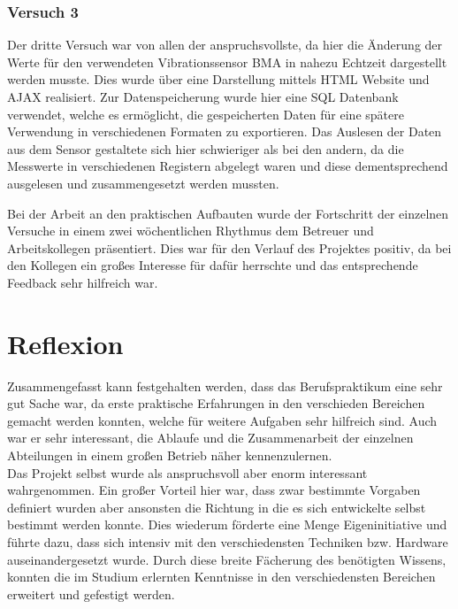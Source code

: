 \subsection{Versuch 3}
Der dritte Versuch war von allen der anspruchsvollste, da hier die Änderung der Werte für den verwendeten Vibrationssensor BMA in nahezu Echtzeit dargestellt werden musste. Dies wurde über eine Darstellung mittels HTML Website und AJAX realisiert. Zur Datenspeicherung wurde hier eine SQL Datenbank verwendet, welche es ermöglicht, die gespeicherten Daten für eine spätere Verwendung in verschiedenen Formaten zu exportieren. Das Auslesen der Daten aus dem Sensor gestaltete sich hier schwieriger als bei den andern, da die Messwerte in verschiedenen Registern abgelegt waren und diese dementsprechend ausgelesen und zusammengesetzt werden mussten.

\vspace{1cm}
Bei der Arbeit an den praktischen Aufbauten wurde der Fortschritt der einzelnen Versuche in einem zwei wöchentlichen Rhythmus dem Betreuer und Arbeitskollegen präsentiert. Dies war für den Verlauf des Projektes positiv, da bei den Kollegen ein großes Interesse für dafür herrschte und das entsprechende Feedback sehr hilfreich war.


\chapter{Reflexion}
Zusammengefasst kann festgehalten werden, dass das Berufspraktikum eine sehr gut Sache war, da erste praktische Erfahrungen in den verschieden Bereichen gemacht werden konnten, welche für weitere Aufgaben sehr hilfreich sind. Auch war er sehr interessant, die Ablaufe und die Zusammenarbeit der einzelnen Abteilungen in einem großen Betrieb näher kennenzulernen.\\
Das Projekt selbst wurde als anspruchsvoll aber enorm interessant wahrgenommen. Ein großer Vorteil hier war, dass zwar bestimmte Vorgaben definiert wurden aber ansonsten die Richtung in die es sich entwickelte selbst bestimmt werden konnte. Dies wiederum förderte eine Menge Eigeninitiative und führte dazu, dass sich intensiv mit den verschiedensten Techniken bzw. Hardware auseinandergesetzt wurde. Durch diese breite Fächerung des benötigten Wissens, konnten die im Studium erlernten Kenntnisse in den verschiedensten Bereichen erweitert und gefestigt werden.